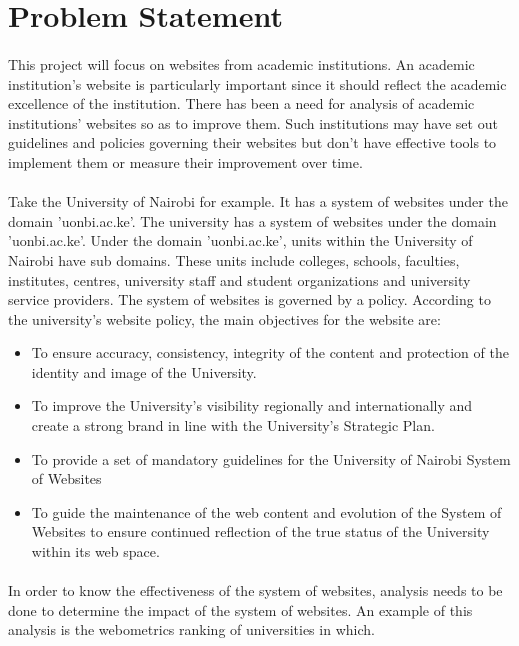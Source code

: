 \section{Problem Statement}
\paragraph{}
This project will focus on websites from academic institutions. An academic institution's website is particularly important since it should reflect the academic excellence of the institution. There has been a need for analysis of academic institutions' websites so as to improve them. Such institutions may have set out guidelines and policies governing their websites but don't have effective tools to implement them or measure their improvement over time.
\paragraph{}
Take the University of Nairobi for example. It has a system of websites under the domain 'uonbi.ac.ke'. The university has a system of websites under the domain 'uonbi.ac.ke'. Under the domain 'uonbi.ac.ke', units within the  University of Nairobi have sub domains. These units include colleges, schools, faculties, institutes, centres, university staff and student organizations and university service providers. The system of websites is governed by a policy. According to the university's website policy, the main objectives for the website are:
\begin{itemize}
\item To ensure accuracy, consistency, integrity of the content and protection of the identity and image of the University.
\item To improve the University's visibility regionally and internationally and create a strong brand in line with the University's Strategic Plan.
\item To provide a set of mandatory guidelines for the University of Nairobi System of Websites
\item To guide the maintenance of the web content and evolution of the System of Websites to ensure continued reflection of the true status of the University within its web space.
\end{itemize}
\paragraph{}
In order to know the effectiveness of the system of websites, analysis needs to be done to determine the impact of the system of websites. An example of this analysis is the webometrics ranking of universities in which.
